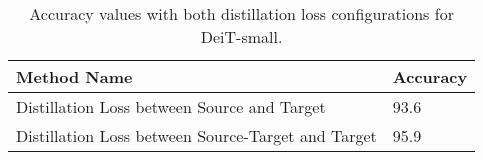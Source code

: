 \documentclass{article}
\begin{document}
\begin{table}[!h] 
    \centering
   \begin{tabular}{ p{7cm}|p{3cm}}
     \hline
     Method Name &  Accuracy\\
     \hline
     Distillation Loss between Source and Target & 93.6\\
     Distillation Loss between Source-Target and Target & 95.9\\
     
     \hline
    \end{tabular}
    \vspace{2mm}
    \caption{Accuracy values with both distillation loss configurations for DeiT-small.}
    \label{tab:my_label}
\end{table}
\end{document}

